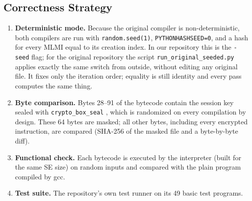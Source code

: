 \documentclass[12pt,a4paper,oneside]{report}
\newcommand{\code}[1]{\texttt{#1}}
\begin{document}
\subsection{Correctness Strategy}
\label{sec:correct}
\begin{enumerate}
\item \textbf{Deterministic mode.} Because the original compiler is non-deterministic, both
      compilers are run with \code{random.seed(1)}, \code{PYTHONHASHSEED=0}, and a hash for every
      MLMI equal to its creation index. In our repository this is the \code{-seed} flag; for the
      original repository the script \code{run\_original\_seeded.py} applies exactly the same
      switch from outside, without editing any original file. It fixes only the iteration order;
      equality is still identity and every pass computes the same thing.
\item \textbf{Byte comparison.} Bytes 28--91 of the bytecode contain the session key sealed with
      \code{crypto\_box\_seal} \cite{libsodium}, which is randomized on every compilation by design.
      These 64 bytes are masked; all other bytes, including every encrypted instruction, are
      compared (SHA-256 of the masked file and a byte-by-byte diff).
\item \textbf{Functional check.} Each bytecode is executed by the interpreter (built for the same
      SE size) on random inputs and compared with the plain program compiled by gcc.
\item \textbf{Test suite.} The repository's own test runner on its 49 basic test programs.
\end{enumerate}
\end{document}
